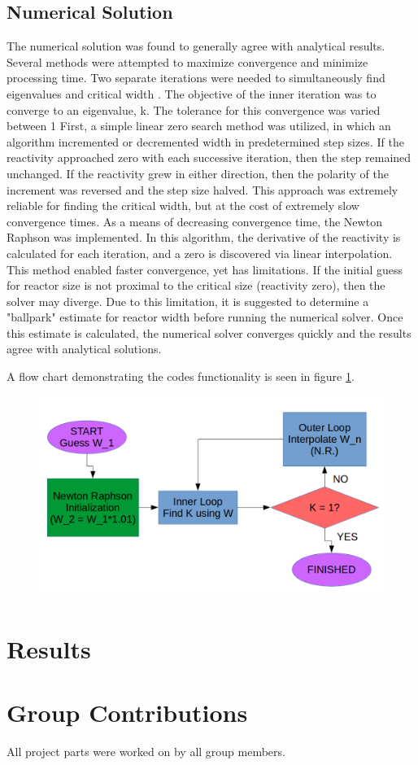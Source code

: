 \documentclass{article}
\begin{document}
		\subsection{Numerical Solution}
			The numerical solution was found to generally agree with analytical results.  Several methods were attempted to maximize convergence and minimize processing time.  Two separate iterations were needed to simultaneously find eigenvalues and critical width .  The objective of the inner iteration was to converge to an eigenvalue, k.  The tolerance for this convergence was varied between 1%
			First, a simple linear zero search method was utilized, in which an algorithm incremented or decremented width in predetermined step sizes.  If the reactivity approached zero with each successive iteration, then the step remained unchanged.  If the reactivity grew in either direction, then the polarity of the increment was reversed and the step size halved.  This approach was extremely reliable for finding the critical width, but at the cost of extremely slow convergence times.  As a means of decreasing convergence time, the Newton Raphson was implemented.  In this algorithm, the derivative of the reactivity is calculated for each iteration, and a zero is discovered via linear interpolation.  This method enabled faster convergence, yet has limitations.  If the initial guess for reactor size is not proximal to the critical size (reactivity zero), then the solver may diverge.  Due to this limitation, it is suggested to determine a "ballpark" estimate for reactor width before running the numerical solver.  Once this estimate is calculated, the numerical solver converges quickly and the results agree with analytical solutions.
			
			A flow chart demonstrating the codes functionality is seen in figure \ref{flow}.
			\begin{figure}
				\includegraphics[width=\linewidth]{flow2.png}
				\label{flow}
			\end{figure}
		
	\section{Results}
		
		
	\section{Group Contributions}
		All project parts were worked on by all group members.		
\end{document}
